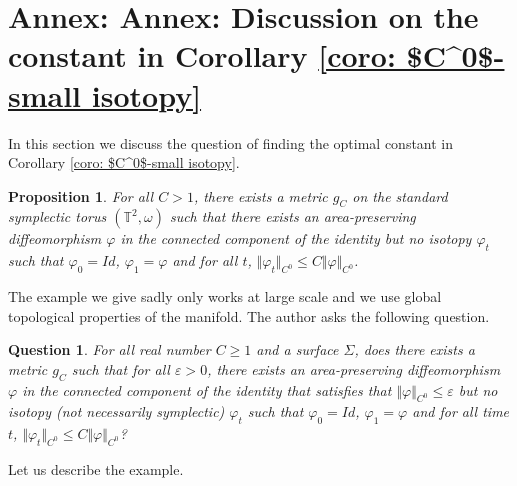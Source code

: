 \documentclass[10pt]{amsart}
\newtheorem{prop}{Proposition}[section]
\newtheorem{ques}{Question}[section]
\begin{document}


\section{Annex: Annex: Discussion on the constant in Corollary \ref{coro: $C^0$-small isotopy}}


In this section we discuss the question of finding the optimal constant in Corollary \ref{coro: $C^0$-small isotopy}.

\begin{prop}\label{prop: counterexample to constant 1}
	For all $C>1$, there exists a metric $g_C$ on the standard symplectic torus $(\mathbb T^2, \omega)$ such that there exists an area-preserving diffeomorphism $\varphi$ in the connected component of the identity but no isotopy $\varphi_t$ such that $\varphi_0=Id$, $\varphi_1=\varphi$ and for all $t$, $\Vert \varphi_t \Vert_{C^0}\leq C \Vert \varphi \Vert_{C^0}$.
\end{prop}

The example we give sadly only works at large scale and we use global topological properties of the manifold. The author asks the following question.

\begin{ques}
	For all real number $C \geq 1$ and a surface $\Sigma$, does there exists a metric $g_C$ such that for all $\varepsilon >0$, there exists an area-preserving diffeomorphism $\varphi$ in the connected component of the identity that satisfies that $\Vert \varphi \Vert_{C^0} \leq \varepsilon$ but no isotopy (not necessarily symplectic) $\varphi_t$ such that $\varphi_0=Id$, $\varphi_1=\varphi$ and for all time $t$, $\Vert \varphi_t \Vert_{C^0} \leq C \Vert \varphi \Vert_{C^0}$?
\end{ques}

Let us describe the example.
\end{document}
